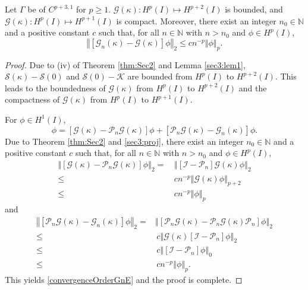 \documentclass[10pt,a4paper]{amsart}
\newcommand{\norm}[1]{\left\Vert#1\right\Vert}
\begin{document}
	\begin{lemma}\label{sec3:lem2}
		Let $\Gamma$ be of $C^{p+3,1}$ for $p\geq1$.  
    $\mathcal{G}(\kappa):H^p(I)\mapsto H^{p+2}(I)$ is bounded, and $\mathcal{G}(\kappa):H^p(I)\mapsto H^{p+1}(I)$ is compact. Moreover,
	there exist an integer $n_0\in\mathbb{N}$ and a positive constant $c$ such that, for all $n\in\mathbb{N}$ with $n>n_0$ and $\phi\in H^{p}(I)$,
	\begin{equation}\label{convergenceOrderGnE} 
		\norm{[\mathcal{G}_n(\kappa)-\mathcal{G}(\kappa)]\phi}_{2}\leq c n^{-p}\norm{\phi}_{p}.
	\end{equation}
	\end{lemma}

	\begin{proof}
		 Due to (iv) of Theorem \ref{thm:Sec2} and Lemma \ref{sec3:lem1}, $\mathcal{S}(\kappa)-\mathcal{S}(0)$ and
		 $\mathcal{S}(0)-\mathcal{K}$ are bounded from $H^{p}(I)$ to $H^{p+2}(I)$.
		  This leads to the boundedness of $\mathcal{G}(\kappa)$  from $H^{p}(I)$ to $H^{p+2}(I)$ and 
		 the compactness of $\mathcal{G}(\kappa)$  from $H^{p}(I)$ to $H^{p+1}(I)$. 
		
		For $\phi\in H^{1}(I)$,
		\begin{equation*}
			[\mathcal{G}(\kappa)-\mathcal{G}_n(\kappa)]\phi=[\mathcal{G}(\kappa)-\mathcal{P}_n\mathcal{G}(\kappa)]\phi+[\mathcal{P}_n\mathcal{G}(\kappa)-\mathcal{G}_n(\kappa)]\phi.
		\end{equation*}
	    Due to Theorem \ref{thm:Sec2} and \eqref{sec3:proj}, 
	    there exist an integer $n_0\in\mathbb{N}$ and a positive constant $c$ such that, for all $n\in\mathbb{N}$ with $n>n_0$ and $\phi\in H^{p}(I)$,
	    \begin{align*}
	    	\norm{[\mathcal{G}(\kappa)-\mathcal{P}_n\mathcal{G}(\kappa)]\phi}_{2}
	    	=& \, \norm{[\mathcal{I}-\mathcal{P}_n]\mathcal{G}(\kappa)\phi}_{2} \\
	    	\leq &\, c n^{-p}\norm{\mathcal{G}(\kappa)\phi}_{p+2}\\
	    	\leq&\, c n^{-p}\norm{\phi}_{p}
	    \end{align*} 
	    and 
	    \begin{align*}
	    	\norm{[\mathcal{P}_n\mathcal{G}(\kappa)-\mathcal{G}_n(\kappa)]\phi}_{2} = &\norm{[\mathcal{P}_n\mathcal{G}(\kappa)-\mathcal{P}_n\mathcal{G}(\kappa)\mathcal{P}_n]\phi}_{2} \\
	    	\leq &\, c\norm{\mathcal{G}(\kappa)[\mathcal{I}-\mathcal{P}_n]\phi}_{2}\\
	    	\leq&\, c \norm{[\mathcal{I}-\mathcal{P}_n]\phi}_{0} \\
	    	\leq &\,c n^{-p}\norm{\phi}_{p}.
	    \end{align*} 
	    This yields \eqref{convergenceOrderGnE} and the proof is complete.
		
		
		
		
		
	\end{proof}
\end{document}
